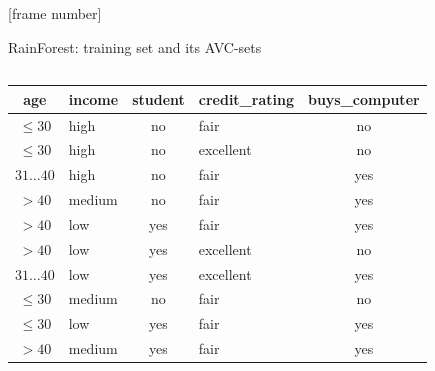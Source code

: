 \documentclass[aspectratio=169,t,table]{beamer}
\begin{document}
  {
    [frame number]
    \begin{frame}{RainForest: training set and its AVC-sets}
      \begin{columns}
        \begin{column}{0.6\textwidth}
          \begin{tabular}{|c|l|c|l|c|}
            \hline
            \cellcolor{blue!20}age & \cellcolor{blue!20}income & \cellcolor{blue!20}student & \cellcolor{blue!20}credit\_rating & \cellcolor{brown!20}buys\_computer \\\hline
            \cellcolor{yellow!20}$\leq30$ & \cellcolor{yellow!20}high & \cellcolor{yellow!20}no & \cellcolor{yellow!20}fair & \cellcolor{red!20}no \\\hline
            \cellcolor{yellow!20}$\leq30$ & \cellcolor{yellow!20}high & \cellcolor{yellow!20}no & \cellcolor{yellow!20}excellent & \cellcolor{red!20}no \\\hline
            \cellcolor{yellow!20}$31\ldots40$ & \cellcolor{yellow!20}high & \cellcolor{yellow!20}no & \cellcolor{yellow!20}fair & \cellcolor{green!20}yes \\\hline
            \cellcolor{yellow!20}$>40$ & \cellcolor{yellow!20}medium & \cellcolor{yellow!20}no & \cellcolor{yellow!20}fair & \cellcolor{green!20}yes \\\hline
            \cellcolor{yellow!20}$>40$ & \cellcolor{yellow!20}low & \cellcolor{yellow!20}yes & \cellcolor{yellow!20}fair & \cellcolor{green!20}yes \\\hline
            \cellcolor{yellow!20}$>40$ & \cellcolor{yellow!20}low & \cellcolor{yellow!20}yes & \cellcolor{yellow!20}excellent & \cellcolor{red!20}no \\\hline
            \cellcolor{yellow!20}$31\ldots40$ & \cellcolor{yellow!20}low & \cellcolor{yellow!20}yes & \cellcolor{yellow!20}excellent & \cellcolor{green!20}yes \\\hline
            \cellcolor{yellow!20}$\leq30$ & \cellcolor{yellow!20}medium & \cellcolor{yellow!20}no & \cellcolor{yellow!20}fair & \cellcolor{red!20}no \\\hline
            \cellcolor{yellow!20}$\leq30$ & \cellcolor{yellow!20}low & \cellcolor{yellow!20}yes & \cellcolor{yellow!20}fair & \cellcolor{green!20}yes \\\hline
            \cellcolor{yellow!20}$>40$ & \cellcolor{yellow!20}medium & \cellcolor{yellow!20}yes & \cellcolor{yellow!20}fair & \cellcolor{green!20}yes \\\hline

\end{tabular}
\end{column}
\end{columns}
\end{frame}}
\end{document}
